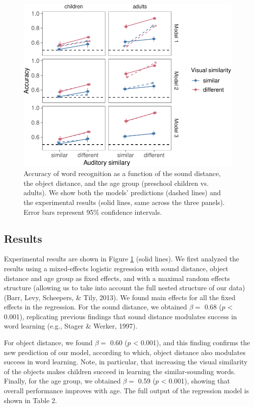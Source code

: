 \documentclass[english,,man]{apa6}
\theoremstyle{definition}
\theoremstyle{definition}
\theoremstyle{definition}
\theoremstyle{remark}
\begin{document}
\begin{figure}[h]

{\centering \includegraphics{ms_blind_files/figure-latex/allData-1} 

}

\caption{Accuracy of word recognition as a function of the sound distance, the object distance, and the age group (preschool children vs. adults). We show both the models' predictions (dashed lines) and the experimental results (solid lines, same across the three panels). Error bars represent 95\% confidence intervals.}\label{fig:allData}
\end{figure}

\subsection{Results}\label{results}

Experimental results are shown in Figure \ref{fig:allData} (solid
lines). We first analyzed the results using a mixed-effects logistic
regression with sound distance, object distance and age group as fixed
effects, and with a maximal random effects structure (allowing us to
take into account the full nested structure of our data) (Barr, Levy,
Scheepers, \& Tily, 2013). We found main effects for all the fixed
effects in the regression. For the sound distance, we obtained
\(\beta =\) 0.68 (\(p\) \textless{} 0.001), replicating previous
findings that sound distance modulates success in word learning (e.g.,
Stager \& Werker, 1997).

For object distance, we found \(\beta =\) 0.60 (\(p\) \textless{}
0.001), and this finding confirms the new prediction of our model,
according to which, object distance also modulates success in word
learning. Note, in particular, that increasing the visual similarity of
the objects makes children succeed in learning the similar-sounding
words. Finally, for the age group, we obtained \(\beta =\) 0.59 (\(p\)
\textless{} 0.001), showing that overall performance improves with age.
The full output of the regression model is shown in Table 2.
\end{document}
